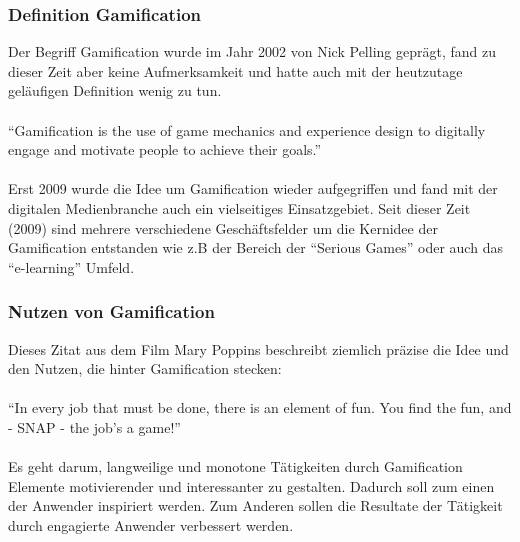 \documentclass[a4paper,12pt]{scrartcl}
\begin{document}
\subsubsection{Definition Gamification}
Der Begriff Gamification wurde im Jahr 2002 von Nick Pelling geprägt, fand zu dieser Zeit aber keine Aufmerksamkeit und hatte auch mit der heutzutage geläufigen Definition wenig zu tun.
\\\\
\enquote{Gamification is the use of game mechanics and experience design to digitally engage and motivate people to achieve their goals.}\cite{gamificationDefinition}
\\\\
Erst 2009 wurde die Idee um Gamification wieder aufgegriffen und fand mit der digitalen Medienbranche auch ein vielseitiges Einsatzgebiet. Seit dieser Zeit (2009) sind mehrere verschiedene Geschäftsfelder um die Kernidee der Gamification entstanden wie z.B der Bereich der \enquote{Serious Games} oder auch das \enquote{e-learning} Umfeld.

\subsubsection{Nutzen von Gamification}
Dieses Zitat aus dem Film Mary Poppins beschreibt ziemlich präzise die Idee und den Nutzen, die hinter Gamification stecken:\\\\ 
\enquote{In every job that must be done, there is an element of fun. You find the fun, and - SNAP - the job's a game!} \footnotemark
{} 
\\\\
Es geht darum, langweilige und monotone Tätigkeiten durch Gamification Elemente motivierender und interessanter zu gestalten. Dadurch soll zum einen der Anwender inspiriert werden. Zum Anderen sollen die Resultate der Tätigkeit durch engagierte Anwender verbessert werden.
\end{document}
